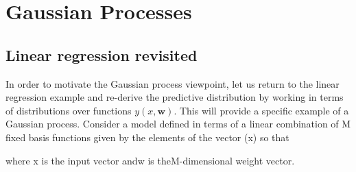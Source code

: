 \section{Gaussian Processes}
\framecard{\insertsection}

\subsection{Linear regression revisited}
\begin{frame}{\insertsubsection}

In order to motivate the Gaussian process viewpoint, let us return to the linear regression example and re-derive the predictive distribution by working in terms of distributions over functions $y(x,\mathbf{w})$. This will provide a specific example of a Gaussian process. Consider a model defined in terms of a linear combination of M fixed basis functions given by the elements of the vector (x) so that 

where x is the input vector andw is theM-dimensional weight vector.

\end{frame}